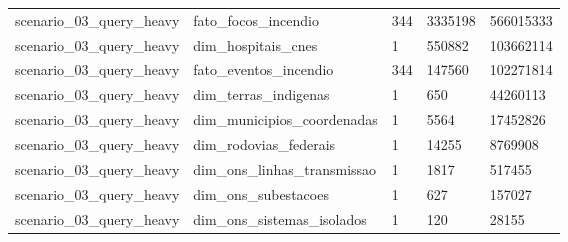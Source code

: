 \begin{landscape}
{\begin{longtable}{lllll}
scenario\_03\_query\_heavy & fato\_focos\_incendio & 344 & 3335198 & 566015333 \\
scenario\_03\_query\_heavy & dim\_hospitais\_cnes & 1 & 550882 & 103662114 \\
scenario\_03\_query\_heavy & fato\_eventos\_incendio & 344 & 147560 & 102271814 \\
scenario\_03\_query\_heavy & dim\_terras\_indigenas & 1 & 650 & 44260113 \\
scenario\_03\_query\_heavy & dim\_municipios\_coordenadas & 1 & 5564 & 17452826 \\
scenario\_03\_query\_heavy & dim\_rodovias\_federais & 1 & 14255 & 8769908 \\
scenario\_03\_query\_heavy & dim\_ons\_linhas\_transmissao & 1 & 1817 & 517455 \\
scenario\_03\_query\_heavy & dim\_ons\_subestacoes & 1 & 627 & 157027 \\
scenario\_03\_query\_heavy & dim\_ons\_sistemas\_isolados & 1 & 120 & 28155 \\
\bottomrule
\end{longtable}
}
\end{landscape}
